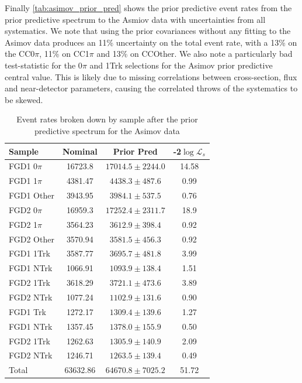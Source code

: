 Finally \autoref{tab:asimov_prior_pred} shows the prior predictive event rates from the prior predictive spectrum to the Asmiov data with uncertainties from all systematics. We note that using the prior covariances without any fitting to the Asimov data produces an 11\% uncertainty on the total event rate, with a 13\% on the CC0$\pi$, 11\% on CC1$\pi$ and 13\% on CCOther. We also note a particularly bad test-statistic for the 0$\pi$ and 1Trk selections for the Asimov prior predictive central value. This is likely due to missing correlations between cross-section, flux and near-detector parameters, causing the correlated throws of the systematics to be skewed.
\begin{table}[h]
	\centering
	\begin{tabular}{l | c c | c}
		\hline
		\hline
		Sample & Nominal & Prior Pred & -2$\log\mathcal{L}_s$ \\ 
		\hline
		FGD1 0$\pi$ & 16723.8 &  $17014.5\pm2244.0$ &  14.58 \\
		FGD1 1$\pi$ & 4381.47 &  $4438.3\pm487.6$ &  0.99 \\
		FGD1 Other & 3943.95 &  $3984.1\pm537.5$  & 0.76\\
		
		FGD2 0$\pi$ & 16959.3 &  $17252.4\pm2311.7$ &  18.9 \\
		FGD2 1$\pi$ & 3564.23 &  $3612.9\pm398.4$ &  0.92 \\
		FGD2 Other & 3570.94 &  $3581.5\pm456.3$ &  0.92 \\
		\hline
		FGD1 1Trk & 3587.77 &  $3695.7\pm481.8$ &  3.99 \\
		FGD1 NTrk & 1066.91 &  $1093.9\pm138.4$ &  1.51  \\
		FGD2 1Trk & 3618.29 &  $3721.1\pm473.6$ &  3.89 \\
		FGD2 NTrk & 1077.24 &  $1102.9\pm131.6$ &  0.90 \\
		\hline
		FGD1 \numu 1 Trk & 1272.17 &  $1309.4\pm139.6$ &  1.27 \\
		FGD1 \numu NTrk & 1357.45 &  $1378.0\pm155.9$ &  0.50 \\
		FGD2 \numu 1Trk & 1262.63 &  $1305.9\pm140.9$ &  2.09 \\
		FGD2 \numu NTrk & 1246.71 &  $1263.5\pm139.4$ &  0.49 \\
		\hline
		Total & 63632.86 & $64670.8\pm7025.2$ & 51.72 \\
		\hline
		\hline
	\end{tabular}
	\caption{Event rates broken down by sample after the prior predictive spectrum for the Asimov data}
	\label{tab:asimov_prior_pred}
\end{table}

